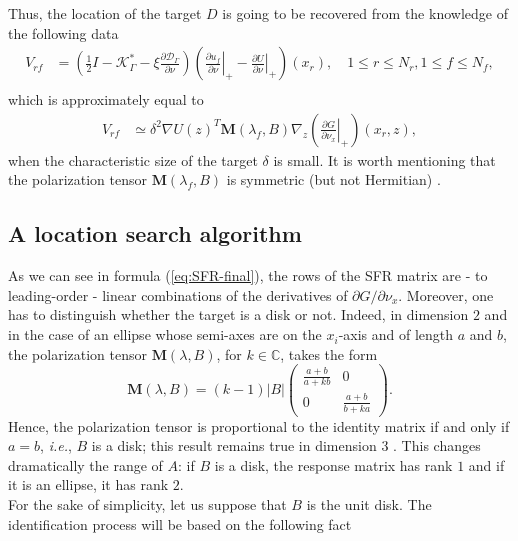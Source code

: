 Thus, the location of the target $D$ is going to be
recovered from the knowledge of the following data
\begin{equation} \label{defdata}
\begin{alignedat}{1}V_{rf} & =\left(\frac{1}{2}I-\mathcal{K}_{\Gamma}^{*}-\xi\frac{
\partial\mathcal{D}_{\Gamma}}{\partial\nu}\right)\left(\left.\frac{\partial u_{f}}{\partial\nu}\right|_{+}-\left.
\frac{\partial U}{\partial\nu}\right|_{+}\right)(x_{r}), \quad 1\leq r\leq N_r, 1 \leq f\leq N_f, \\
\end{alignedat}
\end{equation}
which is approximately equal to
\begin{equation}
\begin{alignedat}{1}V_{rf}
 & \simeq \delta^{2}\nabla U(z)^T \mathbf{M}(\lambda_{f},B) \nabla_{z}\left(\left.\frac{\partial G}{\partial\nu_{x}}\right|_{+}
 \right)(x_{r},z),
\end{alignedat}
\label{eq:SFR-final}
\end{equation}
when the characteristic size of the target $\delta$  is small. It
is worth mentioning that the  polarization tensor $\mathbf{M}(\lambda_{f},B)$ is
symmetric (but not Hermitian) \cite{ammari2007polarization}.


\subsection{A location search algorithm}

\label{sub:algorithm}

As we can see in formula (\ref{eq:SFR-final}), the rows of the SFR
matrix are - to leading-order - linear combinations of the
derivatives of $\partial G/\partial\nu_{x}$. Moreover, one has to
distinguish whether the target is a disk or not. Indeed, in
dimension $2$ and in the case of an ellipse whose semi-axes are on
the $x_{i}$-axis and of length $a$ and $b$, the polarization
tensor $\mathbf{M}(\lambda,B)$, for $k\in \mathbb{C}$,  takes the form
\cite{milton2002theory}
\[
\mathbf{M}(\lambda,B)=(k-1)\vert B\vert\left(\begin{array}{cc}
\frac{a+b}{a+kb} & 0\\
0 & \frac{a+b}{b+ka}
\end{array}\right).
\]
Hence, the polarization tensor is proportional to the identity
matrix if and only if $a=b$, \emph{i.e.}, $B$ is a disk; this
result remains true in dimension $3$
\cite{ammari2007polarization}. This changes dramatically the range
of $A$: if $B$ is a disk, the response matrix
has rank $1$ and if it is an ellipse, it has rank $2$.\\
For the sake of simplicity, let us suppose that $B$ is the unit disk.
The identification process will be based on the following fact

